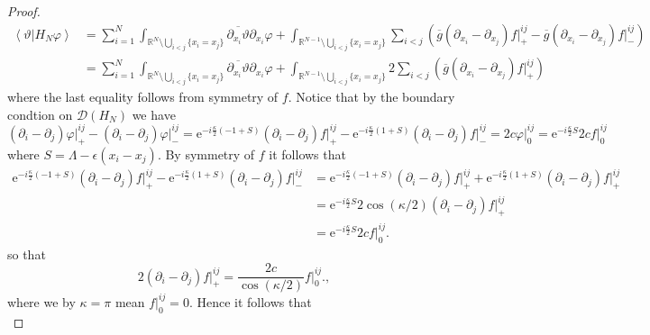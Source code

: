 \documentclass[a4paper,11pt]{article}
\newcommand{\euler}[1]{\text{e}^{#1}}
\renewcommand{\braket}[1]{\left\langle#1\right\rangle}
\newcommand{\R}{\mathbb{R}}
\numberwithin{equation}{section}
\begin{document}
\begin{proof}
				\begin{equation}
				\begin{aligned}
				\braket{\vartheta\vert H_N \varphi}&=\sum_{i=1}^{N}\int_{\R^N\setminus\bigcup_{i<j}\{x_i=x_j\}}\overline{\partial_{x_i}\vartheta}\partial_{x_i}\varphi+\int_{\R^{N-1}\setminus\bigcup_{i<j}\{x_i=x_j\}}\sum_{i< j}\left(\overline{g}(\partial_{x_i}-\partial_{x_j})f\vert^{ij}_+-\overline{g}(\partial_{x_i}-\partial_{x_j})f\vert^{ij}_-\right)\\
				&=\sum_{i=1}^{N}\int_{\R^N\setminus\bigcup_{i<j}\{x_i=x_j\}}\overline{\partial_{x_i}\vartheta}\partial_{x_i}\varphi+\int_{\R^{N-1}\setminus\bigcup_{i<j}\{x_i=x_j\}}2\sum_{i< j}\left(\overline{g}(\partial_{x_i}-\partial_{x_j})f\vert^{ij}_+\right)
				\end{aligned}
				\end{equation}
				where the last equality follows from symmetry of $ f $. Notice that by the boundary condtion on $ \mathcal{D}(H_N) $ we have \begin{equation}
				(\partial_i-\partial_j)\varphi\rvert^{ij}_+-(\partial_i-\partial_j)\varphi\rvert^{ij}_-=\euler{-i\frac{\kappa}{2}\left(-1+S\right)}(\partial_i-\partial_j)f\rvert^{ij}_+-\euler{-i\frac{\kappa}{2}\left(1+S\right)}(\partial_i-\partial_j)f\rvert^{ij}_-=2c \varphi\rvert^{ij}_0=\euler{-i\frac{\kappa}{2}S}2c f\rvert^{ij}_0
				\end{equation}
				where $ S=\Lambda-\epsilon(x_i-x_j) $. By symmetry of $ f $ it follows that \begin{equation}
				\begin{aligned}
				\euler{-i\frac{\kappa}{2}\left(-1+S\right)}(\partial_i-\partial_j)f\rvert^{ij}_+-\euler{-i\frac{\kappa}{2}\left(1+S\right)}(\partial_i-\partial_j)f\rvert^{ij}_-
				&=\euler{-i\frac{\kappa}{2}\left(-1+S\right)}(\partial_i-\partial_j)f\rvert^{ij}_++\euler{-i\frac{\kappa}{2}\left(1+S\right)}(\partial_i-\partial_j)f\rvert^{ij}_+\\
				&=\euler{-i\frac{\kappa}{2}S}2\cos(\kappa/2)(\partial_i-\partial_j)f\rvert^{ij}_+\\
				&=\euler{-i\frac{\kappa}{2}S}2c f\rvert^{ij}_0.
				\end{aligned}
				\end{equation}
				so that \begin{equation}
				2(\partial_i-\partial_j)f\rvert^{ij}_+=\frac{2c}{\cos(\kappa/2)}f\rvert^{ij}_0.,
				\end{equation}
				where we by $ \kappa=\pi $ mean $ f\rvert^{ij}_0=0 $.
				Hence it follows that \begin{equation}\label{EqQuadraticFormDerivation}

\end{equation}
\end{proof}
\end{document}
